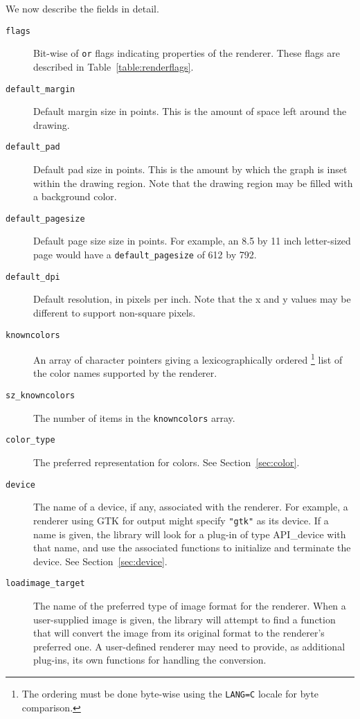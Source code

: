 We now describe the fields in detail.
\begin{description}
\item[{\tt flags}]
Bit-wise of {\tt or} flags indicating properties of the renderer.
These flags are described in Table~\ref{table:renderflags}.
\item[{\tt default\_margin}]
Default margin size in points. This is the amount
of space left around the drawing.
\item[{\tt default\_pad}]
Default pad size in points. This is the amount
by which the graph is inset within the drawing region. Note that the
drawing region may be filled with a background color.
\item[{\tt default\_pagesize}]
Default page size size in points. For example, an 8.5 by 11 inch letter-sized
page would have a {\tt default\_pagesize} of 612 by 792.
\item[{\tt default\_dpi}]
Default resolution, in pixels per inch. Note that the x and y values
may be different to support non-square pixels.
\item[{\tt knowncolors}]
An array of character pointers giving a lexicographically ordered
\footnote{The ordering must be done byte-wise using 
the {\tt LANG=C} locale for
byte comparison.} list of the color names supported by the renderer.
\item[{\tt sz\_knowncolors}]
The number of items in the {\tt knowncolors} array.
\item[{\tt color\_type}]
The preferred representation for colors. See Section~\ref{sec:color}.
\item[{\tt device}]
The name of a device, if any, associated with the renderer. For example,
a renderer using GTK for output might specify {\tt "gtk"} as its device.
If a name is given, the library will look for a plug-in of type API\_device
with that name, and use the associated functions to initialize and terminate
the device. See Section~\ref{sec:device}. 
\item[{\tt loadimage\_target}]
The name of the preferred type of image format for the renderer.
When a user-supplied image is given, the library will attempt to find
a function that will convert the image from its original format to
the renderer's preferred one. A user-defined renderer may need to
provide, as additional plug-ins, its own functions for handling the conversion.
\end{description}

